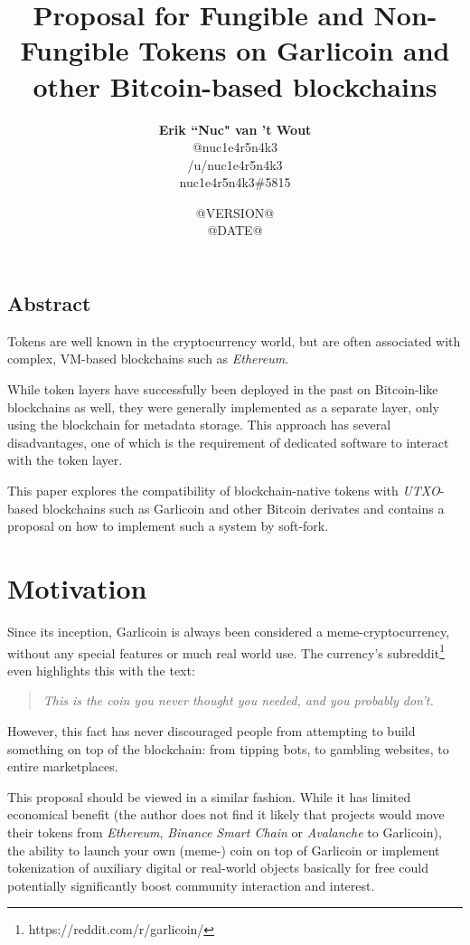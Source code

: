 \documentclass{article}
\title{Proposal for Fungible and Non-Fungible Tokens\newline{}
       on Garlicoin and other Bitcoin-based blockchains
       \vspace{6ex}}
\author{\textbf{Erik ``Nuc" van 't Wout}\\
        {\small @nuc1e4r5n4k3}\\
        {\small /u/nuc1e4r5n4k3}\\
        {\small nuc1e4r5n4k3\#5815}}
\date{\vspace{8ex}
      @VERSION@\\\vspace{1ex}
      @DATE@}
\begin{document}
\maketitle
\vspace{4ex}

\begin{center}
\section*{Abstract}
\end{center}

Tokens are well known in the cryptocurrency world, but are often associated with complex, VM-based blockchains such as \emph{Ethereum}.

While token layers have successfully been deployed in the past on Bitcoin-like blockchains as well, they were generally implemented as a separate layer, only using the blockchain for metadata storage. This approach has several disadvantages, one of which is the requirement of dedicated software to interact with the token layer.

This paper explores the compatibility of blockchain-native tokens with \emph{UTXO}-based blockchains such as Garlicoin and other Bitcoin derivates and contains a proposal on how to implement such a system by soft-fork.

\newpage
\tableofcontents

\newpage
\section{Motivation}

Since its inception, Garlicoin is always been considered a meme-cryptocurrency, without any special features or much real world use. The currency's subreddit\footnote{https://reddit.com/r/garlicoin/} even highlights this with the text:

\begin{quote}
\emph{This is the coin you never thought you needed, and you probably don't.}
\end{quote}

However, this fact has never discouraged people from attempting to build something on top of the blockchain: from tipping bots, to gambling websites, to entire marketplaces.

This proposal should be viewed in a similar fashion. While it has limited economical benefit (the author does not find it likely that projects would move their tokens from \emph{Ethereum}, \emph{Binance Smart Chain} or \emph{Avalanche} to Garlicoin), the ability to launch your own (meme-) coin on top of Garlicoin or implement tokenization of auxiliary digital or real-world objects basically for free could potentially significantly boost community interaction and interest.
\end{document}
